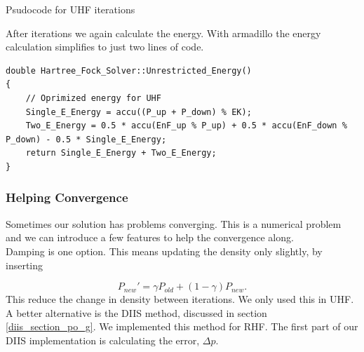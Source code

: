 \documentclass[a4paper,norsk,11pt,twoside]{report}
\begin{document}
\begin{algorithm}[H]
 \caption{Psudocode for UHF iterations}
 \label{UHF_ITERATIVE_PROCEDURE}
\end{algorithm}
After iterations we again calculate the energy. With armadillo the energy calculation simplifies to just two lines of code.

\begin{lstlisting}
double Hartree_Fock_Solver::Unrestricted_Energy()
{
    // Oprimized energy for UHF
    Single_E_Energy = accu((P_up + P_down) % EK);
    Two_E_Energy = 0.5 * accu(EnF_up % P_up) + 0.5 * accu(EnF_down % P_down) - 0.5 * Single_E_Energy;
    return Single_E_Energy + Two_E_Energy;
}
\end{lstlisting}


\subsubsection{Helping Convergence}
Sometimes our solution has problems converging. This is a numerical problem and we can introduce a few features to help the convergence along. \\

Damping is one option. This means updating the density only slightly, by inserting

\begin{equation}
P_{new}' = \gamma P_{old} + \left( 1 - \gamma \right) P_{new} .
\end{equation}
This reduce the change in density between iterations. We only used this in UHF. \\

A better alternative is the DIIS method, discussed in section \ref{diis_section_po_g}. We implemented this method for RHF. The first part of our DIIS implementation is calculating the error, $\Delta p$. 
\end{document}
